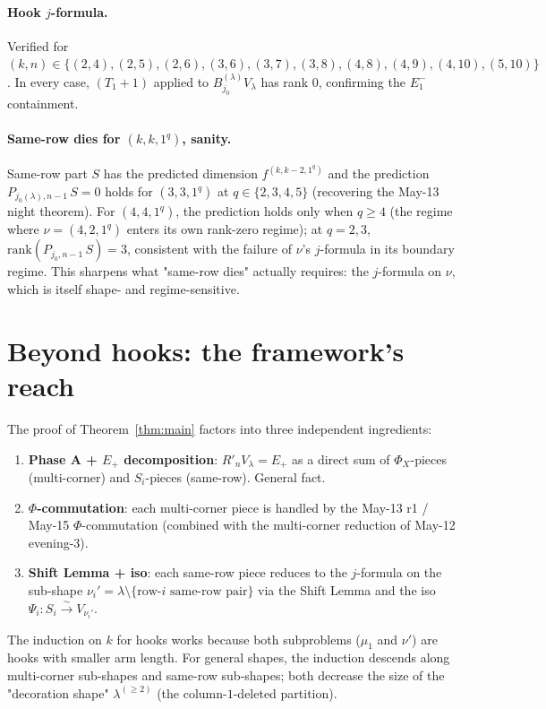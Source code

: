 \documentclass[11pt]{article}
\theoremstyle{definition}
\begin{document}
\paragraph{Hook $j$-formula.}  Verified for $(k, n) \in
\{(2, 4), (2, 5), (2, 6), (3, 6), (3, 7), (3, 8), (4, 8), (4, 9),
(4, 10), (5, 10)\}$.  In every case, $(T_1+1)$ applied to
$B^{(\lambda)}_{j_0} V_\lambda$ has rank $0$, confirming the $E_1^-$
containment.

\paragraph{Same-row dies for $(k, k, 1^q)$, sanity.}  Same-row part
$S$ has the predicted dimension $f^{(k, k-2, 1^q)}$ and the prediction
$P_{j_0(\lambda), n-1}\,S = 0$ holds for $(3, 3, 1^q)$ at
$q \in \{2, 3, 4, 5\}$ (recovering the May-13 night theorem).  For
$(4, 4, 1^q)$, the prediction holds only when $q \ge 4$ (the regime
where $\nu = (4, 2, 1^q)$ enters its own rank-zero regime); at $q = 2, 3$,
$\mathrm{rank}(P_{j_0, n-1}\,S) = 3$, consistent with the failure of
$\nu$'s $j$-formula in its boundary regime.  This sharpens what
"same-row dies" actually requires: the $j$-formula on $\nu$, which is
itself shape- and regime-sensitive.

\section{Beyond hooks: the framework's reach}\label{sec:beyond}

The proof of Theorem~\ref{thm:main} factors into three independent
ingredients:
\begin{enumerate}[leftmargin=2em,topsep=0.2em,itemsep=0.1em,label=(\arabic*)]
\item \textbf{Phase A + $E_+$ decomposition}: $R'_n V_\lambda = E_+$ as
a direct sum of $\Phi_X$-pieces (multi-corner) and $S_i$-pieces
(same-row).  General fact.
\item \textbf{$\Phi$-commutation}: each multi-corner piece is handled by
the May-13 r1 / May-15 $\Phi$-commutation (combined with the
multi-corner reduction of May-12 evening-3).
\item \textbf{Shift Lemma + iso}: each same-row piece reduces to the
$j$-formula on the sub-shape $\nu_i' = \lambda \setminus \{\text{row-}i
\text{ same-row pair}\}$ via the Shift Lemma and the iso $\Psi_i: S_i
\xrightarrow{\sim} V_{\nu_i'}$.
\end{enumerate}

The induction on $k$ for hooks works because both subproblems
($\mu_1$ and $\nu'$) are hooks with smaller arm length.  For general
shapes, the induction descends along multi-corner sub-shapes and
same-row sub-shapes; both decrease the size of the "decoration shape"
$\lambda^{(\ge 2)}$ (the column-$1$-deleted partition).
\end{document}
